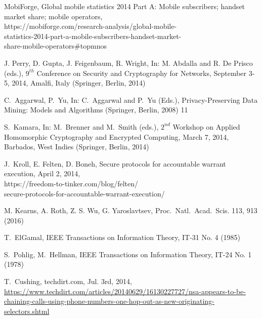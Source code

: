 \documentclass[USenglish,oneside,twocolumn]{article}
\begin{document}
\begin{thebibliography}{99}
 MobiForge, Global mobile statistics 2014 Part A: 
Mobile subscribers; handset market share; mobile operators,\\ 
https://mobiforge.com/research-analysis/global-mobile-\\
statistics-2014-part-a-mobile-subscribers-handset-market-\\
share-mobile-operators\#topmnos

 J. Perry, D. Gupta, J. Feigenbaum, R. Wright,
In: M. Abdalla and R. De Prisco (eds.), $9^{th}$ Conference on Security and 
Cryptography for Networks, September 3-5, 2014, Amalfi, Italy (Springer,
Berlin, 2014)

 C.~Aggarwal, P.~Yu, In: C.~Aggarwal and P.~Yu (Eds.), 
Privacy-Preserving Data Mining: Models and Algorithms 
(Springer, Berlin, 2008) 11

 S.~Kamara, In: M.~Brenner and M.~Smith (eds.), 
$2^{nd}$ Workshop on Applied Homomorphic Cryptography and Encrypted Computing, 
March 7, 2014, Barbados, West Indies (Springer, Berlin, 2014)

 J.~Kroll, E. Felten, D. Boneh, Secure protocols for
accountable warrant execution, April 2, 2014,\\
https://freedom-to-tinker.com/blog/felten/\\
secure-protocols-for-accountable-warrant-execution/

 M. Kearns, A. Roth, Z. S. Wu, G. Yaroslavtsev, 
Proc.~Natl.~Acad.~Scis. 113, 913 (2016)

 T.~ElGamal, IEEE Transactions on Information Theory, IT-31 No. 4 (1985)

 S.~Pohlig, M.~Hellman, IEEE Transactions on Information Theory, IT-24 No. 1 (1978)

 T.~Cushing, techdirt.com, Jul. 3rd, 2014, \url{https://www.techdirt.com/articles/20140629/16130227727/nsa-appears-to-be-chaining-calls-using-phone-numbers-one-hop-out-as-new-originating-selectors.shtml}

\end{thebibliography}
\end{document}
